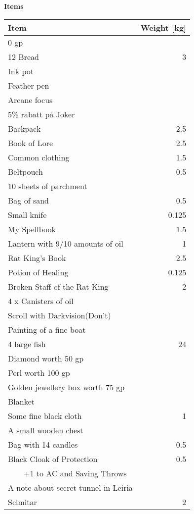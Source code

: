 \documentclass[11pt]{article}
\newcommand{\tabitem}{~~\llap{--}~~}
\begin{document}
\clearpage

	\begin{center}
{\LARGE \textbf{Items}}
	\end{center}
	
\noindent \begin{tabularx}{\textwidth}{X|r}
Item & Weight [kg] \\
\hline
0 gp										& 		\\
12 Bread \dotfill 							& 3 	\\
Ink pot 									& 		\\
Feather pen		 							& 		\\
Arcane focus 								& 		\\
5\% rabatt på Joker 						& 		\\
Backpack \dotfill 							& 2.5 	\\
Book of Lore \dotfill 						& 2.5 	\\
Common clothing \dotfill 					& 1.5 	\\
Beltpouch \dotfill 							& 0.5 	\\
10 sheets of parchment 						& 		\\
Bag of sand \dotfill 						& 0.5 	\\
Small knife \dotfill 						& 0.125 \\
My Spellbook \dotfill 						& 1.5 	\\
Lantern with 9/10 amounts of oil \dotfill 	& 1 	\\
Rat King's Book \dotfill 					& 2.5 	\\
Potion of Healing \dotfill					& 0.125	\\
Broken Staff of the Rat King \dotfill		& 2		\\
4 x Canisters of oil						&		\\
Scroll with	Darkvision(Don't)				&		\\
Painting of a fine boat						&		\\
4 large fish \dotfill						& 24	\\
Diamond worth 50 gp							&		\\
Perl worth 100 gp							&		\\
Golden jewellery box worth 75 gp			&		\\
Blanket										&		\\
Some fine black cloth						& 1		\\
A small wooden chest						&		\\
Bag with 14 candles							& 0.5	\\
Black Cloak	of Protection					& 0.5	\\
\tabitem +1 to AC and Saving Throws			&		\\
A note about secret tunnel in Leiria		&		\\
Scimitar							 		& 2		\\
	\end{tabularx}
\end{document}
